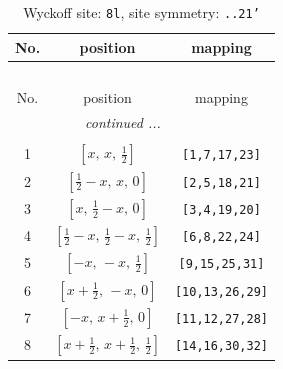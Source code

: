 \documentclass[fleqn,8pt]{jsarticle}
\begin{document}
\begin{longtable}{ccc}
\caption{Wyckoff site: {\tt 8l}, site symmetry: {\tt ..21'}}
 \\
 \hline \hline
No. & position & mapping \\ \hline \endfirsthead

\multicolumn{2}{l}{\tablename\ \thetable{}} \\
 \hline \hline
No. & position & mapping \\ \hline \endhead

 \hline \hline
\multicolumn{2}{r}{\footnotesize\it continued ...} \\ \endfoot

 \hline \hline
\multicolumn{2}{r}{} \\ \endlastfoot

1 & $\left[ x,\, x,\, \frac{1}{2} \right]$ & {\tt [1,7,17,23]} \\ \hline
2 & $\left[ \frac{1}{2} - x,\, x,\, 0 \right]$ & {\tt [2,5,18,21]} \\ \hline
3 & $\left[ x,\, \frac{1}{2} - x,\, 0 \right]$ & {\tt [3,4,19,20]} \\ \hline
4 & $\left[ \frac{1}{2} - x,\, \frac{1}{2} - x,\, \frac{1}{2} \right]$ & {\tt [6,8,22,24]} \\ \hline
5 & $\left[ - x,\, - x,\, \frac{1}{2} \right]$ & {\tt [9,15,25,31]} \\ \hline
6 & $\left[ x + \frac{1}{2},\, - x,\, 0 \right]$ & {\tt [10,13,26,29]} \\ \hline
7 & $\left[ - x,\, x + \frac{1}{2},\, 0 \right]$ & {\tt [11,12,27,28]} \\ \hline
8 & $\left[ x + \frac{1}{2},\, x + \frac{1}{2},\, \frac{1}{2} \right]$ & {\tt [14,16,30,32]} \\
\end{longtable}
\renewcommand{\arraystretch}{1.2}
\end{document}

